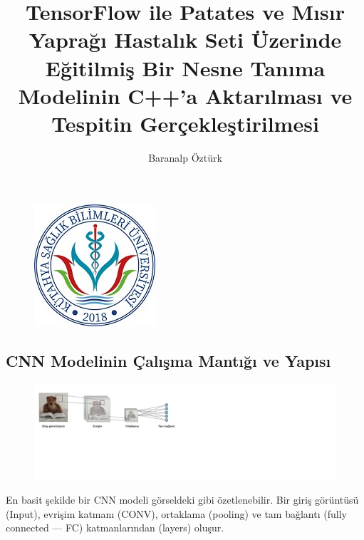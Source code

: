 \documentclass[12pt,a4paper]{article}
\date{}
\title{TensorFlow ile Patates ve Mısır Yaprağı Hastalık Seti Üzerinde Eğitilmiş Bir Nesne Tanıma Modelinin C++'a Aktarılması ve Tespitin Gerçekleştirilmesi}
\author{Baranalp Öztürk}
\begin{document}
	\begin{figure}
		\centering
		\includegraphics{ksbu.jpg}
	\end{figure}
	\maketitle
	
	\begin{center}
		\section*{CNN Modelinin Çalışma Mantığı ve Yapısı}      
	\end{center}
	
	\begin{figure}[h]
		\centering
		\begin{minipage}{\textwidth}
			\centering
			\includegraphics{cnn1.png}
			\vspace{\baselineskip}
			\label{fig:grafik}
		\end{minipage}
	\end{figure}
	
	
	
	
	
	En basit şekilde bir CNN modeli görseldeki gibi özetlenebilir. Bir giriş görüntüsü (Input), evrişim katmanı (CONV), ortaklama (pooling) ve tam bağlantı (fully connected — FC) katmanlarından (layers) oluşur.
	
\end{document}

